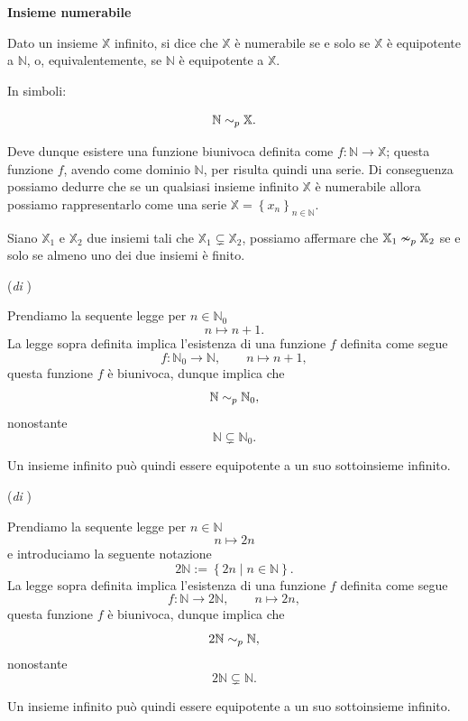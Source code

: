 \begin{definition}
    \textbf{Insieme numerabile}

    Dato un insieme $\mathbb{X}$ infinito, si dice che $\mathbb{X}$ è numerabile
    se e solo se $\mathbb{X}$ è equipotente a $\mathbb{N}$, o, equivalentemente,
    se $\mathbb{N}$ è equipotente a $\mathbb{X}$.
    
    In simboli:

    \[ \mathbb{N} \sim_p \mathbb{X}. \]

    \leavevmode

    Deve dunque esistere una funzione biunivoca definita come $f:\mathbb{N}\rightarrow\mathbb{X}$;
    questa funzione $f$, avendo come dominio $\mathbb{N}$, per 
    risulta quindi una serie. Di conseguenza possiamo dedurre che se un qualsiasi insieme
    infinito $\mathbb{X}$ è numerabile allora possiamo rappresentarlo come una serie
    $\mathbb{X}=\left\{x_n\right\}_{n\in\mathbb{N}}$.
\end{definition}

\begin{proposition}\label{pro:neqpt-fin}
    Siano $\mathbb{X}_1$ e $\mathbb{X}_2$ due insiemi tali che $\mathbb{X}_1 \subsetneq \mathbb{X}_2$,
    possiamo affermare che $\mathbb{X}_1 \nsim_p \mathbb{X}_2$ se e solo se almeno uno dei due insiemi
    è finito.
\end{proposition}

\begin{example}
    (\textit{di} )

    Prendiamo la sequente legge per $n\in\mathbb{N}_0$
    \[ n\mapsto n+1.\]
    La legge sopra definita implica l'esistenza di una funzione $f$ definita come segue
    \[ f:\mathbb{N}_0 \rightarrow \mathbb{N}, \qquad n\mapsto n+1, \]
    questa funzione $f$ è biunivoca, dunque implica che
    \[ \mathbb{N} \sim_p \mathbb{N}_0, \]
    nonostante
    \[ \mathbb{N} \subsetneq \mathbb{N}_0. \]

    Un insieme infinito può quindi essere equipotente a un suo sottoinsieme infinito.
\end{example}

\begin{example}
    (\textit{di} )

    Prendiamo la sequente legge per $n\in\mathbb{N}$
    \[ n\mapsto 2n\]
    e introduciamo la seguente notazione
    \[2\mathbb{N}:=\left\{2n\mid n\in\mathbb{N}\right\}.\]
    La legge sopra definita implica l'esistenza di una funzione $f$ definita come segue
    \[ f:\mathbb{N} \rightarrow 2\mathbb{N}, \qquad n\mapsto 2n, \]
    questa funzione $f$ è biunivoca, dunque implica che
    \[ 2\mathbb{N} \sim_p \mathbb{N}, \]
    nonostante
    \[ 2\mathbb{N} \subsetneq \mathbb{N}. \]

    Un insieme infinito può quindi essere equipotente a un suo sottoinsieme infinito.
\end{example}


